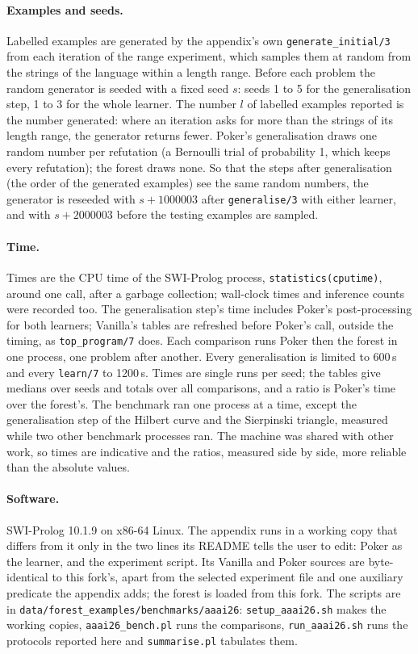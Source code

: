 \documentclass[11pt]{article}
\begin{document}
\paragraph{Examples and seeds.} Labelled examples are generated by the appendix's
own \nolinkurl{generate_initial/3} from each iteration of the range experiment, which
samples them at random from the strings of the language within a length range.
Before each problem the random generator is seeded with a fixed seed $s$: seeds 1
to 5 for the generalisation step, 1 to 3 for the whole learner. The number $l$ of
labelled examples reported is the number generated: where an iteration asks for
more than the strings of its length range, the generator returns fewer. Poker's
generalisation draws one random number per refutation (a Bernoulli trial of
probability 1, which keeps every refutation); the forest draws none. So that the
steps after generalisation (the order of the generated examples) see the same random
numbers, the generator is reseeded with $s + 1000003$ after \nolinkurl{generalise/3}
with either learner, and with $s + 2000003$ before the testing examples are
sampled.

\paragraph{Time.} Times are the CPU time of the SWI-Prolog process,
\texttt{statistics(cputime)}, around one call, after a garbage collection; wall-clock
times and inference counts were recorded too. The generalisation step's time
includes Poker's post-processing for both learners; Vanilla's tables are refreshed
before Poker's call, outside the timing, as \nolinkurl{top_program/7} does. Each
comparison runs Poker then the forest in one process, one problem after another.
Every generalisation is limited to 600\,s and every \nolinkurl{learn/7} to 1200\,s.
Times are single runs per seed; the tables give medians over seeds and totals over
all comparisons, and a ratio is Poker's time over the forest's. The benchmark ran
one process at a time, except the generalisation step of the Hilbert curve and the
Sierpinski triangle, measured while two other benchmark processes ran. The machine
was shared with other work, so times are indicative and the ratios, measured side
by side, more reliable than the absolute values.

\paragraph{Software.} SWI-Prolog 10.1.9 on x86-64 Linux. The appendix runs in a
working copy that differs from it only in the two lines its README tells the user to
edit: Poker as the learner, and the experiment script. Its Vanilla and Poker sources
are byte-identical to this fork's, apart from the selected experiment file and one
auxiliary predicate the appendix adds; the forest is loaded from this fork. The
scripts are in \nolinkurl{data/forest_examples/benchmarks/aaai26}:
\texttt{setup\_aaai26.sh} makes the working copies, \texttt{aaai26\_bench.pl} runs
the comparisons, \texttt{run\_aaai26.sh} runs the protocols reported here and
\texttt{summarise.pl} tabulates them.
\end{document}

